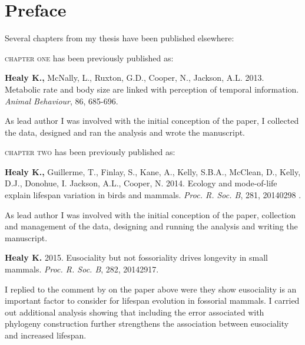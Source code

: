 \chapter*{Preface} %

Several chapters from my thesis have been published elsewhere:

\textsc{chapter one} has been previously published as:
%
\begin{previouspaper}
  \textbf{Healy K.,} McNally, L., Ruxton, G.D., Cooper, N., Jackson, A.L. 2013. Metabolic rate and body size are linked with perception of temporal information. \textit{Animal Behaviour}, 86, 685-696.
\end{previouspaper}
 
As lead author I was involved with the initial conception of the paper, I collected the data, designed and ran the analysis and wrote the manuscript.


{}
\textsc{chapter two} has been previously published as:
%
\begin{previouspaper}
  \textbf{Healy K.,} Guillerme, T., Finlay, S., Kane, A., Kelly, S.B.A., McClean, D., Kelly, D.J., Donohue, I. Jackson, A.L., Cooper, N. 2014. Ecology and mode-of-life explain lifespan variation in birds and mammals. \textit{Proc. R. Soc. B}, 281, 20140298 .
\end{previouspaper}

As lead author I was involved with the initial conception of the paper, collection and management of the data, designing and running the analysis and writing the manuscript.

\begin{previouspaper}
  \textbf{Healy K.} 2015. Eusociality but not fossoriality drives longevity in small mammals. \textit{Proc. R. Soc. B}, 282, 20142917.
\end{previouspaper}

I replied to the comment by \cite{williams2015ecology} on the paper above were they show eusociality is an important factor to consider for lifespan evolution in fossorial mammals. I carried out additional analysis showing that including the error associated with phylogeny construction further strengthens the association between eusociality and increased lifespan.


